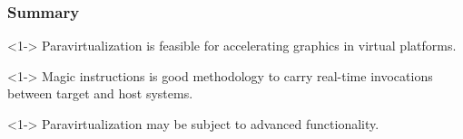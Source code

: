 
\begin{frame}
\frametitle{Summary}

\begin{thm}<1->
	Paravirtualization is feasible for accelerating graphics in virtual platforms.
\end{thm}

\begin{thm}<1->
	Magic instructions is good methodology to carry real-time invocations between target and host systems.
\end{thm}

\begin{thm}<1->
	Paravirtualization may be subject to advanced functionality.
\end{thm}

\end{frame}
